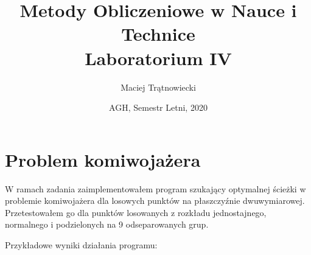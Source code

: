 \documentclass{article}
\title{Metody Obliczeniowe w Nauce i Technice\\ 
Laboratorium IV}
\author{Maciej Trątnowiecki}
\date{AGH, Semestr Letni, 2020}
\begin{document}
    \maketitle
    \section{Problem komiwojażera}
        W ramach zadania zaimplementowałem program szukający optymalnej ścieżki w problemie komiwojażera dla losowych punktów na płaszczyźnie dwuwymiarowej. Przetestowałem go dla punktów losowanych z rozkładu jednostajnego, normalnego i podzielonych na 9 odseparowanych grup. 
        
        
        Przykładowe wyniki działania programu:
        \begin{figure}[h!]
            \centering
            \\

\end{figure}
\end{document}
